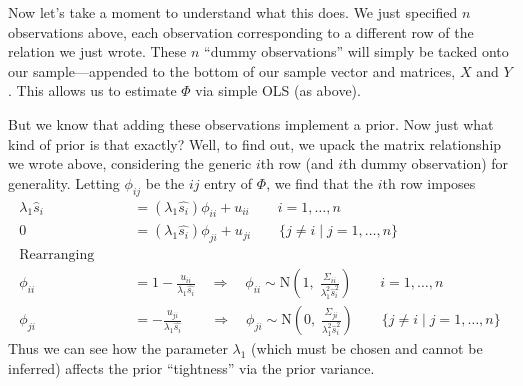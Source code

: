 \documentclass[a4paper,12pt]{scrartcl}
\begin{document}
\begin{enumerate}
	Now let's take a moment to understand what this does.
	We just specified $n$ observations above, each 
	observation corresponding to a different row of the
	relation we just wrote.  These $n$ ``dummy observations'' 
	will simply be tacked onto our sample---appended to the
	bottom of our sample vector and matrices, $X$ and $Y$. 
	This allows us to estimate $\Phi$ via simple OLS (as 
	above). 

	But we know that adding these observations implement
	a prior. Now just what kind of prior is that exactly?
	Well, to find out, we upack the matrix relationship 
	we wrote above, considering the generic $i$th row 
	(and $i$th dummy observation) for generality. 
	Letting $\phi_{ij}$ be the $ij$ entry of $\Phi$, we
	find that the $i$th row imposes
	\begin{align*}
	    \lambda_1 \hat{s}_i &= \left(\lambda_1 
	    \hat{s_i}\right) \phi_{ii} + u_{ii} 
	    \qquad i=1,\ldots, n \\
	    0 &= \left(\lambda_1 
	    \hat{s_i}\right) \phi_{ji} + u_{ji} 
	    \qquad \{ j \neq i \; | \; j = 1, \ldots, n\} \\
	\text{Rearranging} \qquad & \\
	    \phi_{ii} &= 1-\frac{u_{ii}}{\lambda_1 \hat{s_i}} 
	    \quad \Rightarrow \quad \phi_{ii} \sim 
	    \text{N}\left(1, \; \frac{\Sigma_{ii}}{
	    \lambda_1^2 \hat{s}_i^2 }\right) 
	    \qquad i = 1, \ldots, n \\
	    \phi_{ji} &= -\frac{u_{ji}}{\lambda_1 \hat{s_i}} 
	    \qquad \Rightarrow \quad \phi_{ji} \sim 
	    \text{N}\left(0, \; \frac{\Sigma_{ji}}{
	    \lambda_1^2 \hat{s}_i^2 }\right)
	    \qquad \{ j \neq i \; | \; j = 1, \ldots, n\}
	\end{align*}
	Thus we can see how the parameter $\lambda_1$ (which
	must be chosen and cannot be inferred) affects the 
	prior ``tightness'' via the prior variance.


\end{enumerate}
\end{document}
